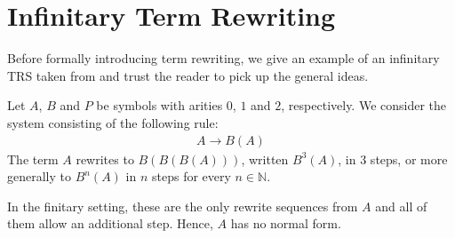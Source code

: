 \chapter{Infinitary Term Rewriting}\label{chap:rewriting}

Before formally introducing term rewriting, we give an example of an
infinitary TRS taken from \citet{klop-de-vrijer-05} and trust the
reader to pick up the general ideas.

Let $A$, $B$ and $P$ be symbols with arities $0$, $1$ and $2$,
respectively. We consider the system consisting of the following rule:
\begin{align*}
A \rightarrow B(A)
\end{align*}
The term $A$
rewrites to $B(B(B(A)))$, written $B^3(A)$, in $3$ steps, or more
generally to $B^n(A)$ in $n$ steps for every $n \in \mathbb{N}$.
\begin{center}
{\footnotesize{}}
\end{center}\vspace{-0.8\baselineskip}
In the finitary setting, these are the only rewrite sequences from $A$
and all of them allow an additional step. Hence, $A$ has no normal
form.

